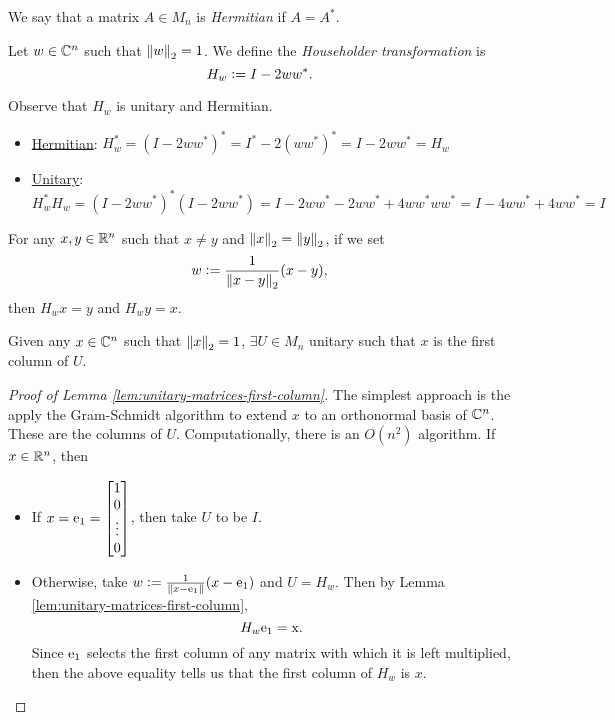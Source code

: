 \begin{definition}[Hermitian]
\label{def:hermitian}
We say that a matrix $A \in M_n$ is \textit{Hermitian} if $A = A^*$.
\end{definition}

\begin{definition}
\label{def:househoulder-transformation}
Let $w \in \mathbb C^n$ such that $\left\lVert w\right\rVert_2 = 1$. We define the \textit{Householder transformation} is
$$
H_w \vcentcolon= I - 2ww^*.
$$
\end{definition}

\begin{remark*}
Observe that $H_w$ is unitary and Hermitian.
\begin{itemize}
    \item \underline{Hermitian}: $H_w^* = (I - 2ww^*)^* = I^* - 2(ww^*)^* = I - 2ww^* = H_w$
    \item \underline{Unitary}: $H_w^* H_w = (I-2ww^*)^*(I-2ww^*) = I - 2ww^* - 2ww^* + 4ww^*ww^* = I - 4ww^* + 4ww^* = I$
\end{itemize}
\end{remark*}

\begin{note*}
For any $x, y \in \mathbb R^n$ such that $x \not= y$ and $\left\lVert x\right\rVert_2 = \left\lVert y\right\rVert_2$, if we set 
$$
w \vcentcolon= \frac{1}{\left\lVert x - y\right\rVert_2} (x-y),
$$
then $H_wx = y$ and $H_w y = x$.
\end{note*}

\begin{lemma}
\label{lem:unitary-matrices-first-column}
Given any $x \in \mathbb C^n$ such that $\left\lVert x\right\rVert_2 = 1$, $\exists U \in M_n$ unitary such that $x$ is the first column of $U$.
\end{lemma}

\begin{proof}[Proof of Lemma \ref{lem:unitary-matrices-first-column}]
The simplest approach is the apply the Gram-Schmidt algorithm to extend $x$ to an orthonormal basis of $\mathbb C^n$. These are the columns of $U$. Computationally, there is an $O(n^2)$ algorithm. If $x \in \mathbb R^n$, then
\begin{itemize}
    \item If $x = \rm{e}_1 = \begin{bmatrix}1 \\ 0 \\ \vdots \\ 0\end{bmatrix}$, then take $U$ to be $I$.
    \item Otherwise, take $w \vcentcolon= \frac{1}{\left\lVert x - \rm{e_1}\right\rVert} (x - \rm{e_1})$ and $U = H_w$. Then by Lemma \ref{lem:unitary-matrices-first-column},
    $$
    H_w \rm{e_1} = x.
    $$
    Since $\rm{e_1}$ selects the first column of any matrix with which it is left multiplied, then the above equality tells us that the first column of $H_w$ is $x$.
\end{itemize}
\end{proof}

